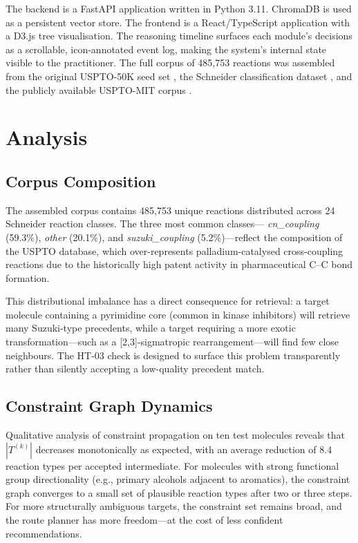 \documentclass[12pt,a4paper]{article}
\begin{document}
The backend is a FastAPI application written in Python 3.11. ChromaDB is used
as a persistent vector store. The frontend is a React/TypeScript application
with a D3.js tree visualisation. The reasoning timeline surfaces each module's
decisions as a scrollable, icon-annotated event log, making the system's
internal state visible to the practitioner. The full corpus of 485{,}753
reactions was assembled from the original USPTO-50K seed set
\cite{lowe2012uspto}, the Schneider classification dataset
\cite{schneider2016classification}, and the publicly available USPTO-MIT corpus
\cite{schwaller2019molecular}.

\section{Analysis}

\subsection{Corpus Composition}

The assembled corpus contains 485{,}753 unique reactions distributed across
24 Schneider reaction classes. The three most common classes—
\textit{cn\_coupling} (59.3\%), \textit{other} (20.1\%), and
\textit{suzuki\_coupling} (5.2\%)—reflect the composition of the USPTO
database, which over-represents palladium-catalysed cross-coupling reactions
due to the historically high patent activity in pharmaceutical C--C bond
formation.

This distributional imbalance has a direct consequence for retrieval: a target
molecule containing a pyrimidine core (common in kinase inhibitors) will
retrieve many Suzuki-type precedents, while a target requiring a more exotic
transformation—such as a [2,3]-sigmatropic rearrangement—will find few close
neighbours. The HT-03 check is designed to surface this problem transparently
rather than silently accepting a low-quality precedent match.

\subsection{Constraint Graph Dynamics}

Qualitative analysis of constraint propagation on ten test molecules reveals
that $|T^{(k)}|$ decreases monotonically as expected, with an average
reduction of 8.4 reaction types per accepted intermediate. For molecules
with strong functional group directionality (e.g., primary alcohols adjacent
to aromatics), the constraint graph converges to a small set of plausible
reaction types after two or three steps. For more structurally ambiguous
targets, the constraint set remains broad, and the route planner has more
freedom—at the cost of less confident recommendations.
\end{document}
